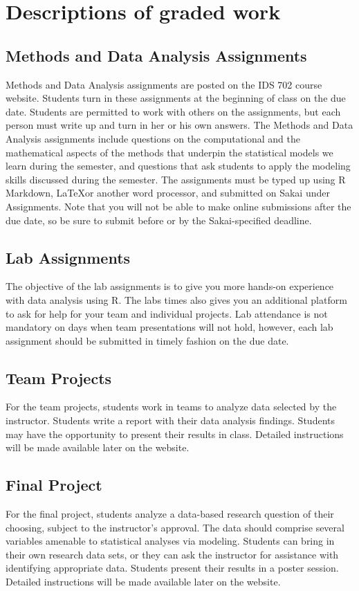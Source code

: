 \documentclass[11pt, a4paper]{article}
\begin{document}
\section{Descriptions of graded work}
\subsection{Methods and Data Analysis Assignments}
Methods and Data Analysis assignments are posted on the IDS 702 course website. Students turn in these assignments at the beginning of class on the due date. Students are permitted to work with others on the assignments, but each person must write up and turn in her or his own answers. The Methods and Data Analysis assignments include questions on the computational and the mathematical aspects of the methods that underpin the statistical models we learn during the semester, and questions that ask students to apply the modeling skills discussed during the semester. The assignments must be typed up using \textsf{R} Markdown, \LaTeX or another word processor, and submitted on Sakai under Assignments. Note that you will not be able to make online submissions after the due date, so be sure to submit before or by the Sakai-specified deadline.

\subsection{Lab Assignments}
The objective of the lab assignments is to give you more hands-on experience with data analysis using R. The labs times also gives you an additional platform to ask for help for your team and individual projects. Lab attendance is not mandatory on days when team presentations will not hold, however, each lab assignment should be submitted in timely fashion on the due date.

\subsection{Team Projects}
For the team projects, students work in teams to analyze data selected by the instructor. Students write a report with their data analysis findings. Students may have the opportunity to present their results in class. Detailed instructions will be made available later on the website.

\subsection{Final Project}
For the final project, students analyze a data-based research question of their choosing, subject to the instructor's approval. The data should comprise several variables amenable to statistical analyses via modeling. Students can bring in their own research data sets, or they can ask the instructor for assistance with identifying appropriate data. Students present their results in a poster session. Detailed instructions will be made available later on the website.
\end{document}

